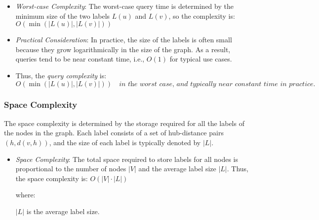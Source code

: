 \begin{appendices}
\begin{itemize}
	\item \textit{Worst-case Complexity}: The worst-case query time is determined by the minimum size of the two labels $ L(u) $ and $ L(v) $, so the complexity is:
	$
	O(\min(|L(u)|, |L(v)|))
	$
	
	\item\textit{Practical Consideration}: In practice, the size of the labels is often small because they grow logarithmically in the size of the graph. As a result, queries tend to be near constant time, i.e., $ O(1) $ for typical use cases.
	
	\item Thus, the \textit{query complexity} is:
	$
	O(\min(|L(u)|, |L(v)|)) \quad \textit{in the worst case, and typically near constant time in practice.}
	$
	
	\end{itemize}
	
	\subsubsection{Space Complexity}
	
	The space complexity is determined by the storage required for all the labels of the nodes in the graph. Each label consists of a set of hub-distance pairs $ (h, d(v, h)) $, and the size of each label is typically denoted by $|L| $.
	
	\begin{itemize}
	\item	\textit{Space Complexity}: The total space required to store labels for all nodes is proportional to the number of nodes $|V|$ and the average label size $ |L| $. Thus, the space complexity is:	$ O(|V| \cdot |L|) $ 
	
	where:
	
	 $|L| $ is the average label size.
	
	\end{itemize}
	
	

	
	
	
	
	
\end{appendices}